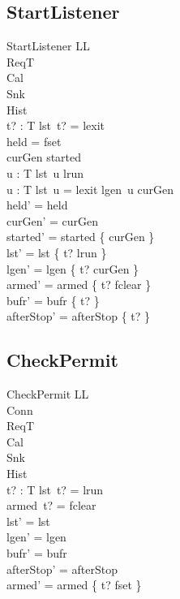 \documentclass[a4paper,10pt,fleqn]{article}
\begin{document}
\subsection{StartListener}

\begin{schema}{StartListener}
  \Delta LL \\
  \Xi ReqT \\
  \Xi Cal \\
  \Xi Snk \\
  \Xi Hist \\
  t? : T
\where
  lst~t? = lexit \\
  held = fset \\
  curGen \notin started \\
  \forall u : T \spot lst~u \neq lrun \\
  \forall u : T \spot lst~u = lexit \lor lgen~u \neq curGen \\
  held' = held \\
  curGen' = curGen \\
  started' = started \cup \{ curGen \} \\
  lst' = lst \oplus \{ t? \mapsto lrun \} \\
  lgen' = lgen \oplus \{ t? \mapsto curGen \} \\
  armed' = armed \oplus \{ t? \mapsto fclear \} \\
  bufr' = bufr \oplus \{ t? \mapsto \emptyset \} \\
  afterStop' = afterStop \oplus \{ t?  \}
\end{schema}

\subsection{CheckPermit}

\begin{schema}{CheckPermit}
  \Delta LL \\
  \Xi Conn \\
  \Xi ReqT \\
  \Xi Cal \\
  \Xi Snk \\
  \Xi Hist \\
  t? : T
\where
  lst~t? = lrun \\
  armed~t? = fclear \\
  lst' = lst \\
  lgen' = lgen \\
  bufr' = bufr \\
  afterStop' = afterStop \\
  armed' = armed \oplus \{ t? \mapsto fset \}
\end{schema}
\end{document}
